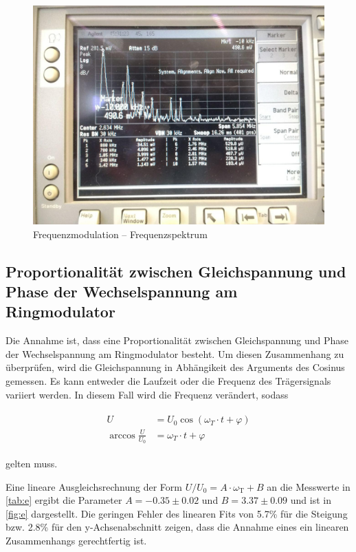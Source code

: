 \begin{figure}
	\centering
	\includegraphics[width=\textwidth]{img/Aufgabenteil_d.jpg}
	\caption{Frequenzmodulation -- Frequenzspektrum}
	\label{d2}
\end{figure}

\subsection{Proportionalität zwischen Gleichspannung und Phase der Wechselspannung am Ringmodulator}

Die Annahme ist, dass eine Proportionalität zwischen Gleichspannung und Phase der Wechselspannung am Ringmodulator besteht. Um diesen Zusammenhang zu überprüfen, wird die Gleichspannung in Abhängikeit des Arguments des Cosinus gemessen. Es kann entweder die Laufzeit oder die Frequenz des Trägersignals variiert werden. In diesem Fall wird die Frequenz verändert, sodass

\begin{align}
\begin{split}
	U &= U_0 \cos(\omega_T \cdot t + \varphi)\\
	\arccos \frac{U}{U_0} &= \omega_T \cdot t + \varphi
\end{split}
\end{align}

gelten muss.



Eine lineare Ausgleichsrechnung der Form $U/U_0 = A \cdot \omega_\text{T} + B$ an die Messwerte in \autoref{tab:e} ergibt die Parameter $A = -0.35 \pm 0.02$ und $B = 3.37 \pm 0.09$ und ist in \autoref{fig:e} dargestellt. Die geringen Fehler des linearen Fits von 5.7\% für die Steigung bzw. 2.8\% für den y-Achsenabschnitt zeigen, dass die Annahme eines ein linearen Zusammenhangs gerechtfertig ist.

